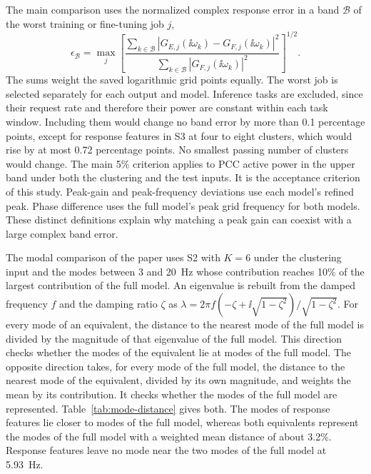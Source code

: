 The main comparison uses the normalized complex response error in a band $\mathcal B$ of the worst training or fine-tuning job $j$,
\begin{equation}
\epsilon_{\mathcal B}=\max_j\left[\frac{\sum_{k\in\mathcal B}|G_{E,j}(\ii\omega_k)-G_{F,j}(\ii\omega_k)|^2}{\sum_{k\in\mathcal B}|G_{F,j}(\ii\omega_k)|^2}\right]^{1/2}.
\end{equation}
The sums weight the saved logarithmic grid points equally.
The worst job is selected separately for each output and model.
Inference tasks are excluded, since their request rate and therefore their power are constant within each task window.
Including them would change no band error by more than 0.1 percentage points, except for response features in S3 at four to eight clusters, which would rise by at most 0.72 percentage points.
No smallest passing number of clusters would change.
The main 5\% criterion applies to PCC active power in the upper band under both the clustering and the test inputs.
It is the acceptance criterion of this study.
Peak-gain and peak-frequency deviations use each model's refined peak.
Phase difference uses the full model's peak grid frequency for both models.
These distinct definitions explain why matching a peak gain can coexist with a large complex band error.

The modal comparison of the paper uses S2 with $K=6$ under the clustering input and the modes between 3 and 20~Hz whose contribution reaches 10\% of the largest contribution of the full model.
An eigenvalue is rebuilt from the damped frequency $f$ and the damping ratio $\zeta$ as $\lambda=2\pi f(-\zeta+\ii\sqrt{1-\zeta^2})/\sqrt{1-\zeta^2}$.
For every mode of an equivalent, the distance to the nearest mode of the full model is divided by the magnitude of that eigenvalue of the full model.
This direction checks whether the modes of the equivalent lie at modes of the full model.
The opposite direction takes, for every mode of the full model, the distance to the nearest mode of the equivalent, divided by its own magnitude, and weights the mean by its contribution.
It checks whether the modes of the full model are represented.
Table~\ref{tab:mode-distance} gives both.
The modes of response features lie closer to modes of the full model, whereas both equivalents represent the modes of the full model with a weighted mean distance of about 3.2\%.
Response features leave no mode near the two modes of the full model at 5.93~Hz.


